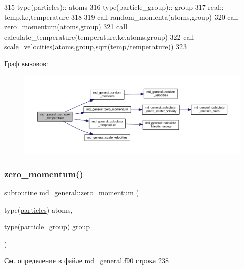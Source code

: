\begin{DoxyCode}
315     \textcolor{keywordtype}{type}(particles)::   atoms
316     \textcolor{keywordtype}{type}(particle\_group):: group
317     \textcolor{keywordtype}{real}:: temp,ke,temperature
318     
319     \textcolor{keyword}{call }random\_momenta(atoms,group)
320     \textcolor{keyword}{call }zero\_momentum(atoms,group)
321     \textcolor{keyword}{call }calculate\_temperature(temperature,ke,atoms,group)
322     \textcolor{keyword}{call }scale\_velocities(atoms,group,sqrt(temp/temperature))
323 
\end{DoxyCode}
Граф вызовов\+:\nopagebreak
\begin{figure}[H]
\begin{center}
\leavevmode
\includegraphics[width=350pt]{namespacemd__general_a9f99fa4920c9047597f37b777dd44b3c_cgraph}
\end{center}
\end{figure}
\mbox{\label{namespacemd__general_a79ea9e512a27c651278559e30f97a336}} 
\subsubsection{\texorpdfstring{zero\+\_\+momentum()}{zero\_momentum()}}
{\footnotesize\ttfamily subroutine md\+\_\+general\+::zero\+\_\+momentum (\begin{DoxyParamCaption}\item[{type(\mbox{\hyperlink{structmd__general_1_1particles}{particles}})}]{atoms,  }\item[{type(\mbox{\hyperlink{structmd__general_1_1particle__group}{particle\+\_\+group}})}]{group }\end{DoxyParamCaption})}



См. определение в файле md\+\_\+general.\+f90 строка 238


